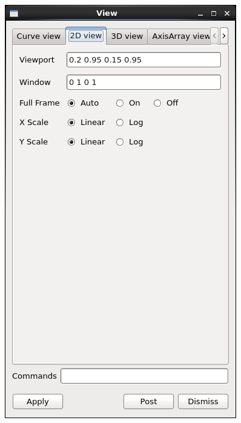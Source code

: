 \begin{frame}
\vspace{-1mm}
\begin{columns}[T]
\begin{column}{3cm}
        \includegraphics[width=.9\columnwidth]{figs/visit-guis/visit_view2d}
\end{column}
\begin{column}{3cm}

\end{column}
\end{columns}
\end{frame}
